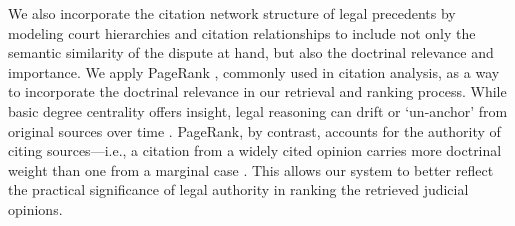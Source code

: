 We also incorporate the citation network structure of legal precedents by modeling court hierarchies and citation relationships to include not only the semantic similarity of the dispute at hand, but also the doctrinal relevance and importance. We apply PageRank \cite{page1999pagerank}, commonly used in citation analysis, as a way to incorporate the doctrinal relevance in our retrieval and ranking process. While basic degree centrality offers insight, legal reasoning can drift or `un-anchor' from original sources over time \cite{32_LegalCitationNetwork}. PageRank, by contrast, accounts for the authority of citing sources—i.e., a citation from a widely cited opinion carries more doctrinal weight than one from a marginal case \cite{page1999pagerank}. This allows our system to better reflect the practical significance of legal authority in ranking the retrieved judicial opinions.

